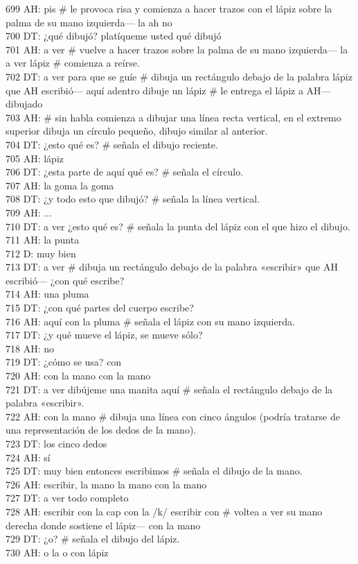 699 AH: pis \# le provoca risa y comienza a hacer trazos con el lápiz sobre la palma de su mano izquierda--- la ah no\\
700 DT: ¿qué dibujó? platíqueme usted qué dibujó\\
701 AH: a ver \# vuelve a hacer trazos sobre la palma de su mano izquierda--- la a ver lápiz \# comienza a reírse. \\
702 DT: a ver para que se guíe \# dibuja un rectángulo debajo de la palabra lápiz que AH escribió--- aquí adentro dibuje un lápiz \# le entrega el lápiz a AH--- dibujado\\
703 AH: \# sin habla comienza a dibujar una línea recta vertical, en el extremo superior dibuja un círculo pequeño, dibujo similar al anterior.\\
704 DT: ¿esto qué es? \# señala el dibujo reciente.\\
705 AH: lápiz\\
706 DT: ¿esta parte de aquí qué es? \# señala el círculo.\\
707 AH: la goma la goma\\
708 DT: ¿y todo esto que dibujó? \# señala la línea vertical.\\
709 AH: ...\\
710 DT: a ver ¿esto qué es? \# señala la punta del lápiz con el que hizo el dibujo.\\
711 AH: la punta\\
712 D: muy bien\\
713 DT: a ver \# dibuja un rectángulo debajo de la palabra «escribir» que AH escribió--- ¿con qué escribe?\\
714 AH: una pluma\\
715 DT: ¿con qué partes del cuerpo escribe?\\
716 AH: aquí con la pluma \# señala el lápiz con su mano izquierda.\\
717 DT: ¿y qué mueve el lápiz, se mueve sólo?\\
718 AH: no\\
719 DT: ¿cómo se usa? con\\
720 AH: con la mano con la mano\\
721 DT: a ver dibújeme una manita aquí \# señala el rectángulo debajo de la palabra «escribir».\\
722 AH: con la mano \# dibuja una línea con cinco ángulos (podría tratarse de una representación de los dedos de la mano).\\
723 DT: los cinco dedos\\
724 AH: sí\\
725 DT: muy bien entonces escribimos \# señala el dibujo de la mano.\\
726 AH: escribir, la mano la mano con la mano\\
727 DT: a ver todo completo\\
728 AH: escribir con la cap con la /k/ escribir con \# voltea a ver su mano derecha donde sostiene el lápiz--- con la mano\\
729 DT: ¿o? \# señala el dibujo del lápiz.\\
730 AH: o la o con lápiz\\
